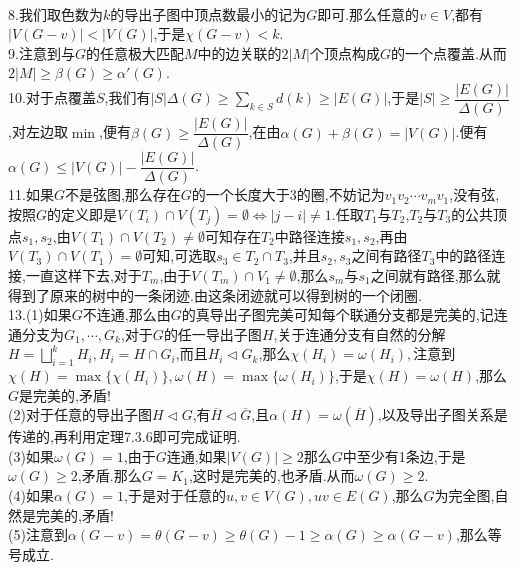 \documentclass[b5paper]{ctexart}
\begin{document}
\pagestyle{plain}
\noindent
{}
\\
8.我们取色数为$k$的导出子图中顶点数最小的记为$G$即可.那么任意的$v\in V$,都有$|V(G-v)|<|V(G)|$,于是$\chi(G-v)<k$.\\
9.注意到与$G$的任意极大匹配$M$中的边关联的$2|M|$个顶点构成$G$的一个点覆盖.从而$2|M|\geq \beta(G)\geq \alpha'(G)$.\\
10.对于点覆盖$S$,我们有$|S|\Delta(G)\geq \sum_{k\in S}d(k)\geq |E(G)|$,于是$|S|\geq \dfrac{|E(G)|}{\Delta(G)}$,对左边取$\min$,便有$\beta(G)\geq \dfrac{|E(G)|}{\Delta(G)}$,在由$\alpha(G)+\beta(G)=|V(G)|$.便有$\alpha(G)\leq |V(G)|-\dfrac{|E(G)|}{\Delta(G)}$.\\
11.如果$G$不是弦图,那么存在$G$的一个长度大于3的圈,不妨记为$v_1v_2\cdots v_mv_1$,没有弦,按照$G$的定义即是$V(T_i)\cap V(T_j)=\emptyset \Leftrightarrow |j-i|\neq 1$.任取$T_1$与$T_2$,$T_2$与$T_3$的公共顶点$s_1,s_2$,由$V(T_1)\cap V(T_2)\neq \emptyset$可知存在$T_2$中路径连接$s_1,s_2$,再由$V(T_3)\cap V(T_1)=\emptyset$可知,可选取$s_3\in T_2\cap T_3$,并且$s_2,s_3$之间有路径$T_3$中的路径连接,一直这样下去,对于$T_m$,由于$V(T_m)\cap V_1\neq \emptyset$,那么$s_m$与$s_1$之间就有路径,那么就得到了原来的树中的一条闭迹.由这条闭迹就可以得到树的一个闭圈.\\
13.(1)如果$G$不连通,那么由$G$的真导出子图完美可知每个联通分支都是完美的,记连通分支为$G_1,\cdots,G_k$,对于$G$的任一导出子图$H$,关于连通分支有自然的分解$H=\bigsqcup_{i=1}^kH_i,H_i=H\cap G_i$,而且$H_i\lhd G_k$,那么$\chi(H_i)=\omega(H_i),$注意到$\chi(H)=\max\{\chi(H_i)\},\omega(H)=\max\{\omega(H_i)\}$,于是$\chi(H)=\omega(H)$,那么$G$是完美的,矛盾!\\
(2)对于任意的导出子图$H\lhd G$,有$\overline{H}\lhd \overline{G}$,且$\alpha(H)=\omega(\overline{H})$,以及导出子图关系是传递的,再利用定理7.3.6即可完成证明.\\
(3)如果$\omega(G)=1$,由于$G$连通,如果$|V(G)|\geq 2$那么$G$中至少有1条边,于是$\omega(G)\geq 2$,矛盾.那么$G=K_1$,这时是完美的,也矛盾.从而$\omega(G)\geq 2$.\\
(4)如果$\alpha(G)=1$,于是对于任意的$u,v\in V(G),uv\in E(G)$,那么$G$为完全图,自然是完美的,矛盾!\\
(5)注意到$\alpha(G-v)=\theta(G-v)\geq \theta(G)-1\geq \alpha(G)\geq \alpha(G-v)$,那么等号成立.
\end{document}
